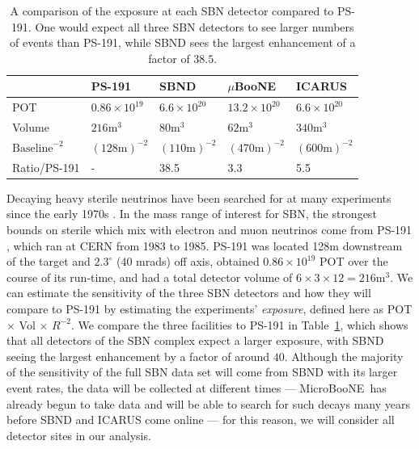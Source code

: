 \documentclass[11pt, a4paper]{article}
\newcommand{\reftab}[1]{Table~\ref{#1}}
\def\muboone{MicroBooNE}
\begin{document}
\begin{table}[t!]
\centering
\begin{tabular}{| l || l | l | l | l |}
	\hline
	& PS-191 & SBND & $\mu$BooNE & ICARUS \\ \hline \hline
	POT	& $0.86 \times 10^{19}$	& $6.6 \times 10^{20}$	&	$13.2 \times 10^{20}$     &  $6.6 \times 10^{20}$ \\ \hline
	Volume	& $216\text{m}^3$	&	$80\text{m}^3$	&	$62\text{m}^3$	     &   $340\text{m}^3$	\\ \hline
	$\text{Baseline}^{-2}$	& $(128 	\text{m} )^{-2}$	&$(110 \text{m} )^{-2}$	&	$(470 \text{m} )^{-2}$			     & $(600 \text{m} )^{-2}$	  \\ \hline
Ratio/PS-191 & - 	& 38.5 	& 3.3	& 5.5\\ \hline
\end{tabular}

\caption{\label{tab:exposure} A comparison of the exposure at each SBN detector
compared to PS-191. One would expect all  three SBN detectors to see larger
numbers of events than PS-191, while SBND sees the largest enhancement of a
factor of $38.5$.}

\end{table}

Decaying heavy sterile neutrinos have been searched for at many experiments
since the early 1970s \cite{}. In the mass range of interest for SBN, the
strongest bounds on sterile which mix with electron and muon neutrinos come
from PS-191 \cite{Bernardi:1985ny}, which ran at CERN from 1983 to 1985. 
%
PS-191 was located 128m downstream of the target and $2.3^\circ$ (40 mrads) off
axis, obtained $0.86 \times 10^{19}$ POT over the course of its run-time, and
had a total detector volume of $6\times3\times12 = 216 \text{m}^3$. We can
estimate the sensitivity of the three SBN detectors and how they will compare
to PS-191 by estimating the experiments' \emph{exposure}, defined here as POT
$\times$ Vol $\times$ $R^{-2}$. We compare the three facilities to PS-191 in
\reftab{tab:exposure}, which shows that all detectors of the SBN complex expect
a larger exposure, with SBND seeing the largest enhancement by a factor of
around $40$. Although the majority of the sensitivity of the full SBN data set
will come from SBND with its larger event rates, the data will be collected at
different times --- \muboone\ has already begun to take data and will be able
to search for such decays many years before SBND and ICARUS come online --- for
this reason, we will consider all detector sites in our analysis.
\end{document}
